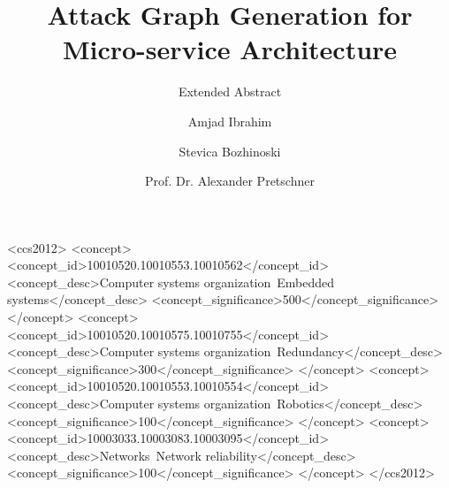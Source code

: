 \documentclass[sigconf]{acmart}
\begin{document}
\title{Attack Graph Generation for Micro-service
	Architecture}
\subtitle{Extended Abstract}

\author{Amjad Ibrahim}

\author{Stevica Bozhinoski}

\author{Prof. Dr. Alexander Pretschner}

\renewcommand{\shortauthors}{B. Trovato et al.}


\begin{abstract}
	


\end{abstract}

%
%
\begin{CCSXML}
<ccs2012>
 <concept>
  <concept_id>10010520.10010553.10010562</concept_id>
  <concept_desc>Computer systems organization~Embedded systems</concept_desc>
  <concept_significance>500</concept_significance>
 </concept>
 <concept>
  <concept_id>10010520.10010575.10010755</concept_id>
  <concept_desc>Computer systems organization~Redundancy</concept_desc>
  <concept_significance>300</concept_significance>
 </concept>
 <concept>
  <concept_id>10010520.10010553.10010554</concept_id>
  <concept_desc>Computer systems organization~Robotics</concept_desc>
  <concept_significance>100</concept_significance>
 </concept>
 <concept>
  <concept_id>10003033.10003083.10003095</concept_id>
  <concept_desc>Networks~Network reliability</concept_desc>
  <concept_significance>100</concept_significance>
 </concept>
</ccs2012>  
\end{CCSXML}





\maketitle







 
\end{document}
